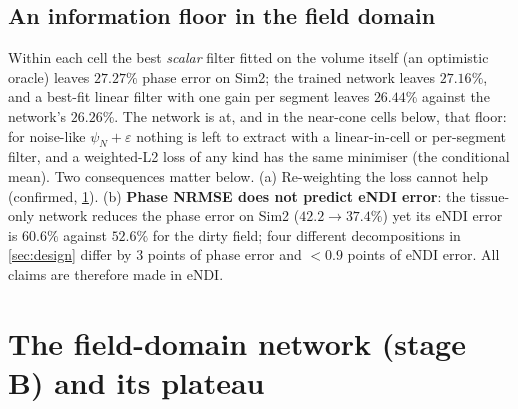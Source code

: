 \documentclass[11pt]{article}
\begin{document}
\subsection{An information floor in the field domain}\label{sec:floor}
Within each cell the best \emph{scalar} filter fitted on the volume itself (an optimistic oracle) leaves $27.27\%$ phase error on Sim2; the trained network leaves $27.16\%$, and a best-fit linear filter with one gain per segment leaves $26.44\%$ against the network's $26.26\%$. The network is at, and in the near-cone cells below, that floor: for noise-like $\psi_N+\varepsilon$ nothing is left to extract with a linear-in-cell or per-segment filter, and a weighted-L2 loss of any kind has the same minimiser (the conditional mean).
Two consequences matter below. (a) Re-weighting the loss cannot help (confirmed, \cref{sec:network}). (b) \textbf{Phase NRMSE does not predict eNDI error}: the tissue-only network reduces the phase error on Sim2 ($42.2\to37.4\%$) yet its eNDI error is $60.6\%$ against $52.6\%$ for the dirty field; four different decompositions in \cref{sec:design} differ by $3$ points of phase error and $<0.9$ points of eNDI error. All claims are therefore made in eNDI.

\section{The field-domain network (stage B) and its plateau}\label{sec:network}
\end{document}
